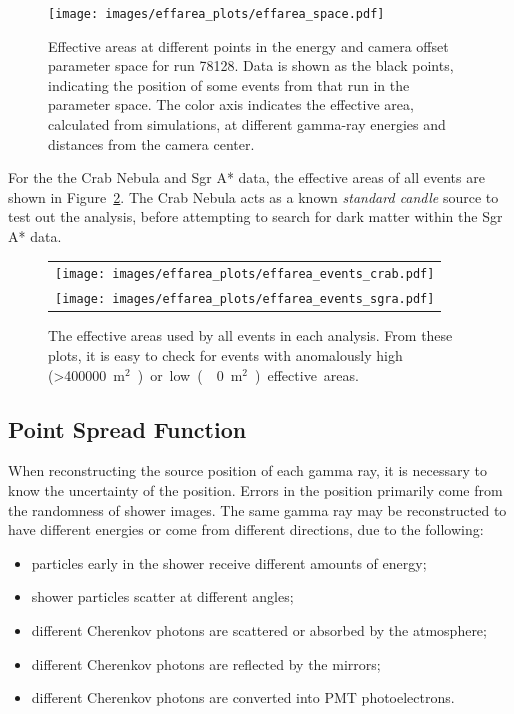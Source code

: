 \begin{figure}[!t]
  \centering
  \texttt{[image: images/effarea\_plots/effarea\_space.pdf]}
  \caption[Effective Area Parameter Space]{
    Effective areas at different points in the energy and camera offset parameter space for run 78128.
    Data is shown as the black points, indicating the position of some events from that run in the parameter space.
    The color axis indicates the effective area, calculated from simulations, at different gamma-ray energies and distances from the camera center.
  }
  \label{fig:effarea_paramspace}
\end{figure}

For the the Crab Nebula and Sgr A* data, the effective areas of all events are shown in Figure~\ref{fig:effarea_usage}.
The Crab Nebula acts as a known \textit{standard candle} source to test out the analysis, before attempting to search for dark matter within the Sgr A* data.
    
    \begin{figure}[!t]
      \centering
      \begin{tabular}{c}
        \texttt{[image: images/effarea\_plots/effarea\_events\_crab.pdf]} \\
        \texttt{[image: images/effarea\_plots/effarea\_events\_sgra.pdf]}
      \end{tabular}
      \caption[Effective Areas Used]{
      The effective areas used by all events in each analysis.
      From these plots, it is easy to check for events with anomalously high (>\SI{400000}{m${}^2$}) or low (\nicetilde\SI{0}{m${}^2$}) effective areas.
      }
      \label{fig:effarea_usage}
    \end{figure}
  
  \FloatBarrier

  \subsection{Point Spread Function}\label{subsec:psf}

    When reconstructing the source position of each gamma ray, it is necessary to know the uncertainty of the position.
    Errors in the position primarily come from the randomness of shower images.
    The same gamma ray may be reconstructed to have different energies or come from different directions, due to the following:
    
    \begin{itemize}[label=$\bullet$,noitemsep]
      \item particles early in the shower receive different amounts of energy;
      \item shower particles scatter at different angles;
      \item different Cherenkov photons are scattered or absorbed by the atmosphere;
      \item different Cherenkov photons are reflected by the mirrors;
      \item different Cherenkov photons are converted into PMT photoelectrons.
    \end{itemize}
    
